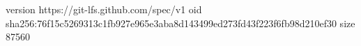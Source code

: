 version https://git-lfs.github.com/spec/v1
oid sha256:76f15c5269313c1fb927e965e3aba8d143499ed273fd43f223f6fb98d210ef30
size 87560
